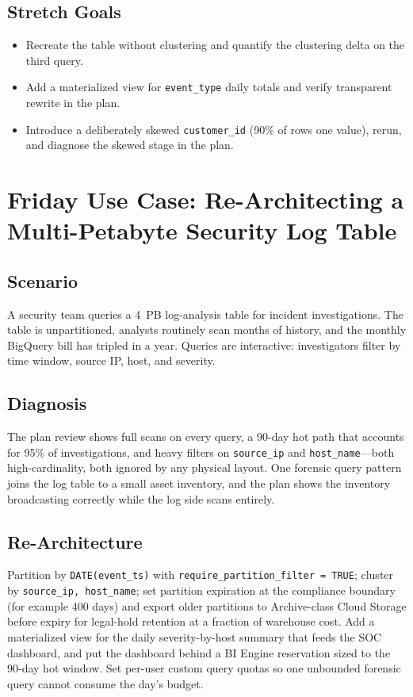 \subsection*{Stretch Goals}
\begin{itemize}
    \item Recreate the table without clustering and quantify the clustering delta on the third query.
    \item Add a materialized view for \texttt{event\_type} daily totals and verify transparent rewrite in the plan.
    \item Introduce a deliberately skewed \texttt{customer\_id} (90\% of rows one value), rerun, and diagnose the skewed stage in the plan.
\end{itemize}

\section{Friday Use Case: Re-Architecting a Multi-Petabyte Security Log Table}

\subsection{Scenario}
A security team queries a 4~PB log-analysis table for incident investigations. The table is unpartitioned, analysts routinely scan months of history, and the monthly BigQuery bill has tripled in a year. Queries are interactive: investigators filter by time window, source IP, host, and severity.

\subsection{Diagnosis}
The plan review shows full scans on every query, a 90-day hot path that accounts for 95\% of investigations, and heavy filters on \texttt{source\_ip} and \texttt{host\_name}---both high-cardinality, both ignored by any physical layout. One forensic query pattern joins the log table to a small asset inventory, and the plan shows the inventory broadcasting correctly while the log side scans entirely.

\subsection{Re-Architecture}
Partition by \texttt{DATE(event\_ts)} with \texttt{require\_partition\_filter = TRUE}; cluster by \texttt{source\_ip, host\_name}; set partition expiration at the compliance boundary (for example 400 days) and export older partitions to Archive-class Cloud Storage before expiry for legal-hold retention at a fraction of warehouse cost. Add a materialized view for the daily severity-by-host summary that feeds the SOC dashboard, and put the dashboard behind a BI Engine reservation sized to the 90-day hot window. Set per-user custom query quotas so one unbounded forensic query cannot consume the day's budget.

